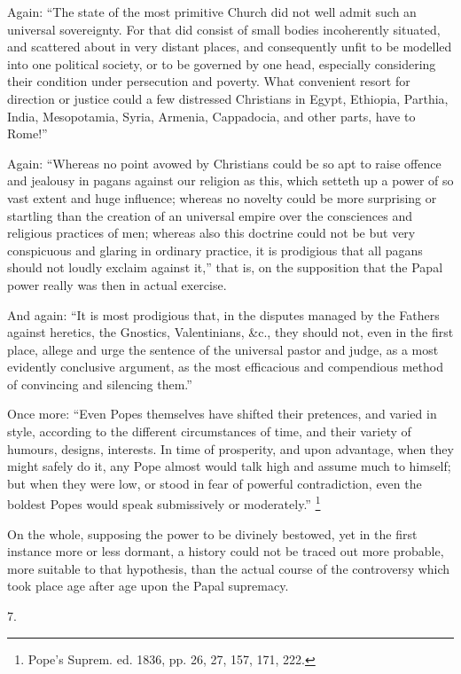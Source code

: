 Again: ``The state of the most primitive Church
did not well admit such an universal sovereignty. For
that did consist of small bodies incoherently situated,
and scattered about in very distant places, and
consequently unfit to be modelled into one political
society, or to be governed by one head, especially
considering their condition under persecution and
poverty. What convenient resort for direction or justice
could a few distressed Christians in Egypt, Ethiopia,
Parthia, India, Mesopotamia, Syria, Armenia, Cappadocia,
and other parts, have to Rome!''

Again: ``Whereas no point avowed by Christians
could be so apt to raise offence and jealousy in pagans
against our religion as this, which setteth up a power of
so vast extent and huge influence; whereas no novelty
could be more surprising or startling than the creation
of an universal empire over the consciences and religious
practices of men; whereas also this doctrine could not be
but very conspicuous and glaring in ordinary practice, it
is prodigious that all pagans should not loudly exclaim
against it,'' that is, on the supposition that the
Papal power really was then in actual exercise.

And again: ``It is most prodigious that, in the
disputes managed by the Fathers against heretics, the
Gnostics, Valentinians, \&c., they should not, even in
the first place, allege and urge the sentence of the
universal pastor and judge, as a most evidently
conclusive argument, as the most efficacious and
compendious method of convincing and silencing
them.''

Once more: ``Even Popes themselves have shifted
their pretences, and varied in style, according to the
different circumstances of time, and their variety of
humours, designs, interests. In time of prosperity, and
upon advantage, when they might safely do it, any Pope
almost would talk high and assume much to himself; but
when they were low, or stood in fear of powerful
contradiction, even the boldest Popes would speak
submissively or moderately.'' \footnote{Pope's Suprem. ed. 1836, pp.
26, 27, 157, 171, 222.}

On the whole, supposing the power to be divinely
bestowed, yet in the first instance more or less dormant,
a history could not be traced out more probable, more
suitable to that hypothesis, than the actual course of
the controversy which took place age after age upon the
Papal supremacy.

7.

